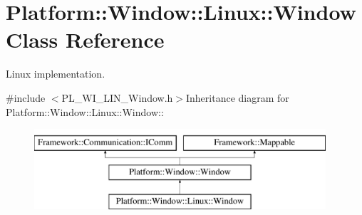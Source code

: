 \hypertarget{classPlatform_1_1Window_1_1Linux_1_1Window}{
\section{Platform::Window::Linux::Window Class Reference}
\label{classPlatform_1_1Window_1_1Linux_1_1Window}
}


Linux implementation.  


{\ttfamily \#include $<$PL\_\-WI\_\-LIN\_\-Window.h$>$}Inheritance diagram for Platform::Window::Linux::Window::\begin{figure}[H]
\begin{center}
\leavevmode
\includegraphics[height=3cm]{classPlatform_1_1Window_1_1Linux_1_1Window}
\end{center}
\end{figure}
